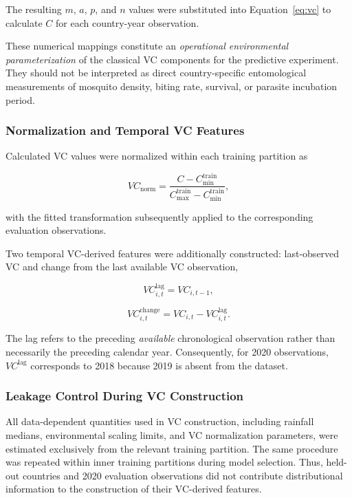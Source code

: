 \documentclass[10pt,twocolumn]{article}
\begin{document}
The resulting \(m\), \(a\), \(p\), and \(n\) values were substituted
into Equation~\ref{eq:vc} to calculate \(C\) for each country-year
observation.

These numerical mappings constitute an \emph{operational environmental
parameterization} of the classical VC components for the predictive
experiment. They should not be interpreted as direct country-specific
entomological measurements of mosquito density, biting rate, survival,
or parasite incubation period.


\subsubsection{Normalization and Temporal VC Features}

Calculated VC values were normalized within each training partition as

\begin{equation}
VC_{\mathrm{norm}}
=
\frac{
C-C_{\min}^{\mathrm{train}}
}{
C_{\max}^{\mathrm{train}}
-
C_{\min}^{\mathrm{train}}
},
\label{eq:vc_normalization}
\end{equation}

with the fitted transformation subsequently applied to the
corresponding evaluation observations.

Two temporal VC-derived features were additionally constructed:
last-observed VC and change from the last available VC observation,

\begin{equation}
VC^{\mathrm{lag}}_{i,t}
=
VC_{i,t-1},
\label{eq:vc_lag}
\end{equation}

\begin{equation}
VC^{\mathrm{change}}_{i,t}
=
VC_{i,t}
-
VC^{\mathrm{lag}}_{i,t}.
\label{eq:vc_change}
\end{equation}

The lag refers to the preceding \emph{available} chronological
observation rather than necessarily the preceding calendar year.
Consequently, for 2020 observations, \(VC^{\mathrm{lag}}\) corresponds
to 2018 because 2019 is absent from the dataset.


\subsubsection{Leakage Control During VC Construction}

All data-dependent quantities used in VC construction, including
rainfall medians, environmental scaling limits, and VC normalization
parameters, were estimated exclusively from the relevant training
partition. The same procedure was repeated within inner training
partitions during model selection. Thus, held-out countries and 2020
evaluation observations did not contribute distributional information
to the construction of their VC-derived features.
\end{document}
